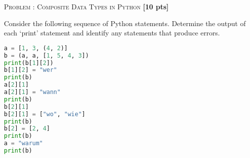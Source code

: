 \documentclass[a4paper,11pt]{article}
\newenvironment{tcomment}[1][]{
	\begin{mdframed}[
		linecolor=black,
		linewidth=0.5pt,
		innerleftmargin=5pt,
		innerrightmargin=5pt,
		innertopmargin=5pt,
		innerbottommargin=5pt
		]
		\small\color[RGB]{70,70,70}
		\textbf{Notes:}\par\vspace{5cm}
		}{\end{mdframed}}
\newcounter{pnr}
\newenvironment{problem}[2][]{
\noindent\textsc{Problem \arabic{pnr}: #2} \hfill \textbf{[#1 pts]}\par
	\stepcounter{pnr}
	}{
	}{\vspace{0.3cm}}
\begin{document}
\begin{problem}[10]{Composite Data Types in Python}
Consider the following sequence of Python statements. Determine the output of each `print' statement and identify any statements that produce errors.

\begin{lstlisting}[language=Python]
a = [1, 3, (4, 2)]
b = (a, a, [1, 5, 4, 3])
print(b[1][2])
b[1][2] = "wer"
print(b)
a[2][1]
a[2][1] = "wann"
print(b)
b[2][1]
b[2][1] = ["wo", "wie"]
print(b)
b[2] = [2, 4]
print(b)
a = "warum"
print(b)
\end{lstlisting}
\end{problem}
\end{document}

